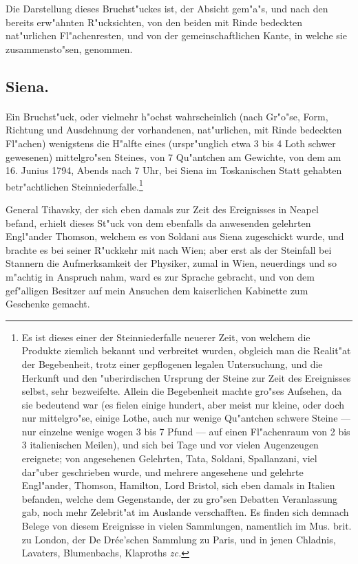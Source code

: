 \documentclass[a4paper, 11pt, oneside, german]{article}
\begin{document}
Die Darstellung dieses Bruchst"uckes ist, der Absicht gem"a"s, und nach den bereits erw"ahnten R"ucksichten, von den beiden mit Rinde bedeckten nat"urlichen Fl"achenresten, und von der gemeinschaftlichen Kante, in welche sie zusammensto"sen, genommen.

\subsection{Siena.}
\paragraph{}
Ein Bruchst"uck, oder vielmehr h"ochst wahrscheinlich (nach Gr"o"se, Form, Richtung und Ausdehnung der vorhandenen, nat"urlichen, mit Rinde bedeckten Fl"achen) wenigstens die H"alfte eines (urspr"unglich etwa 3 bis 4 Loth schwer gewesenen) mittelgro"sen Steines, von 7 Qu"antchen am Gewichte, von dem am 16. Junius 1794, Abends nach 7 Uhr, bei Siena im Toskanischen Statt gehabten betr"achtlichen Steinniederfalle.\footnote{Es ist dieses einer der Steinniederfalle neuerer Zeit, von welchem die Produkte ziemlich bekannt und verbreitet wurden, obgleich man die Realit"at der Begebenheit, trotz einer gepflogenen legalen Untersuchung, und die Herkunft und den "uberirdischen Ursprung der Steine zur Zeit des Ereignisses selbst, sehr bezweifelte. Allein die Begebenheit machte gro"ses Aufsehen, da sie bedeutend war (es fielen einige hundert, aber meist nur kleine, oder doch nur mittelgro"se, einige Lothe, auch nur wenige Qu"antchen schwere Steine --- nur einzelne wenige wogen 3 bis 7 Pfund --- auf einen Fl"achenraum von 2 bis 3 italienischen Meilen), und sich bei Tage und vor vielen Augenzeugen ereignete; von angesehenen Gelehrten, Tata, Soldani, Spallanzani, viel dar"uber geschrieben wurde, und mehrere angesehene und gelehrte Engl"ander, Thomson, Hamilton, Lord Bristol, sich eben damals in Italien befanden, welche dem Gegenstande, der zu gro"sen Debatten Veranlassung gab, noch mehr Zelebrit"at im Auslande verschafften. Es finden sich demnach Belege von diesem Ereignisse in vielen Sammlungen, namentlich im Mus. brit. zu London, der De Drée'schen Sammlung zu Paris, und in jenen Chladnis, Lavaters, Blumenbachs, Klaproths \emph{zc.}}

General Tihavsky, der sich eben damals zur Zeit des Ereignisses in Neapel befand, erhielt dieses St"uck von dem ebenfalls da anwesenden gelehrten Engl"ander Thomson, welchem es von Soldani aus Siena zugeschickt wurde, und brachte es bei seiner R"uckkehr mit nach Wien; aber erst als der Steinfall bei Stannern die Aufmerksamkeit der Physiker, zumal in Wien, neuerdings und so m"achtig in Anspruch nahm, ward es zur Sprache gebracht, und von dem gef"alligen Besitzer auf mein Ansuchen dem kaiserlichen Kabinette zum Geschenke gemacht.
\end{document}
